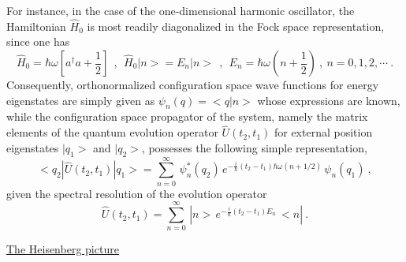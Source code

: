 \documentclass[a4paper,11pt]{article}
\begin{document}
\vspace{10pt}

For instance, in the case of the one-dimensional harmonic oscillator,
the Hamiltonian $\hat{H}_0$ is most readily diagonalized in the Fock
space representation, since one has
\begin{equation}
\hat{H}_0=\hbar\omega\left[a^\dagger a+\frac{1}{2}\right]\ \ ,\ \ 
\hat{H}_0|n>=E_n|n>\ \ ,\ \ 
E_n=\hbar\omega(n+\frac{1}{2})\ ,\ n=0,1,2,\cdots\ .
\end{equation}
Consequently, orthonormalized configuration space wave functions for 
energy eigenstates are simply given as $\psi_n(q)=<q|n>$ whose expressions 
are known, while the configuration space propagator of the system, namely 
the matrix elements of the quantum evolution operator $\hat{U}(t_2,t_1)$ for
external position eigenstates $|q_1>$ and $|q_2>$, possesses the following 
simple representation,
\begin{equation}
<q_2|\hat{U}(t_2,t_1)|q_1>=\sum_{n=0}^\infty\,
\psi_n^*(q_2)\,e^{-\frac{i}{\hbar}(t_2-t_1)\hbar\omega(n+1/2)}\,
\psi_n(q_1)\ ,
\end{equation}
given the spectral resolution of the evolution operator
\begin{equation}
\hat{U}(t_2,t_1)=\sum_{n=0}^\infty\,|n>\,
e^{-\frac{i}{\hbar}(t_2-t_1)E_n}\,<n|\ .
\end{equation}

\vspace{10pt}

\noindent\underline{The Heisenberg picture}

\vspace{5pt}
\end{document}
